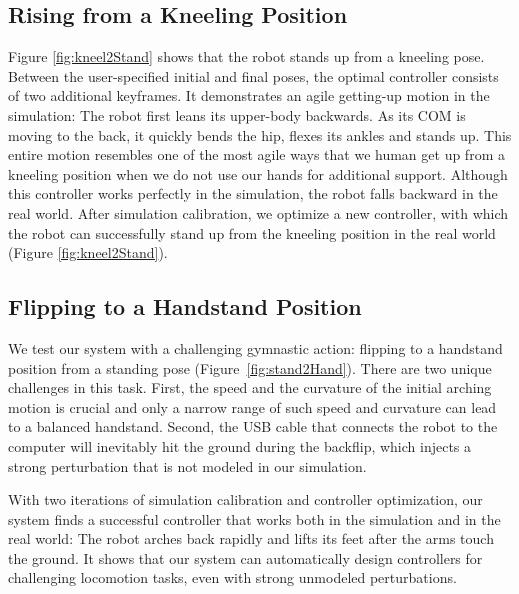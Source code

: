 \subsection{Rising from a Kneeling Position}

Figure \ref{fig:kneel2Stand} shows that the robot stands up from a kneeling pose. Between the user-specified initial and final poses, the optimal controller consists of two additional keyframes. It demonstrates an agile getting-up motion in the simulation: The robot first leans its upper-body backwards. As its COM is moving to the back, it quickly bends the hip, flexes its ankles and stands up. This entire motion resembles one of the most agile ways that we human get up from a kneeling position when we do not use our hands for additional support. Although this controller works perfectly in the simulation, the robot falls backward in the real world. After simulation calibration, we optimize a new controller, with which the robot can successfully stand up from the kneeling position in the real world (Figure \ref{fig:kneel2Stand}).

\subsection{Flipping to a Handstand Position}
We test our system with a challenging gymnastic action: flipping to a handstand position from a standing pose (Figure~\ref{fig:stand2Hand}). There are two unique challenges in this task. First, the speed and the curvature of the initial arching motion is crucial and only a narrow range of such speed and curvature can lead to a balanced handstand. Second, the USB cable that connects the robot to the computer will inevitably hit the ground during the backflip, which injects a strong perturbation that is not modeled in our simulation.

With two iterations of simulation calibration and controller optimization, our system finds a successful controller that works both in the simulation and in the real world: The robot arches back rapidly and lifts its feet after the arms touch the ground. It shows that our system can automatically design controllers for challenging locomotion tasks, even with strong unmodeled perturbations.

